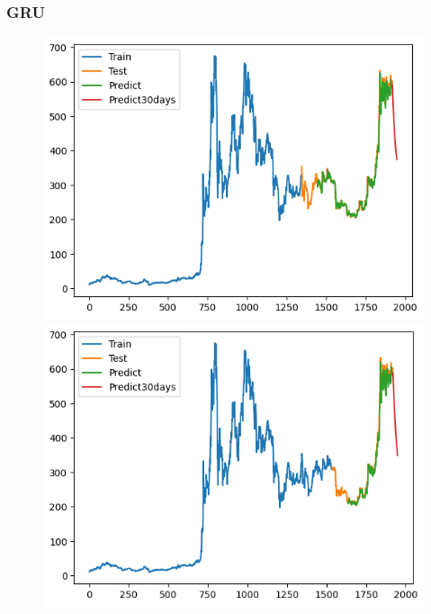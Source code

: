 \documentclass[conference]{IEEEtran}
\begin{document}
	\subsubsection{GRU}
	
		\begin{figure}[H]
			\centering
			\begin{minipage}{0.15\textwidth}
				\centering
				\includegraphics[width=1\textwidth]{Figure/GRU_BNB_73.png}
			\end{minipage}
			\hfill
			\begin{minipage}{0.15\textwidth}
				\centering
				\includegraphics[width=1\textwidth]{Figure/GRU_BNB_82.png}
			\end{minipage}
			\hfill
			\begin{minipage}{0.15\textwidth}

\end{minipage}
\end{figure}
\end{document}
